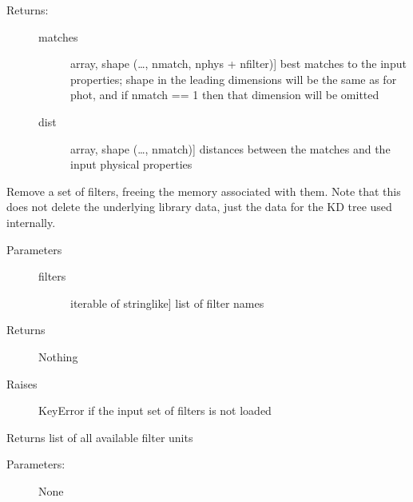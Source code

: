 \documentclass[letterpaper,10pt,english]{sphinxmanual}
\begin{document}
\begin{fulllineitems}
\begin{fulllineitems}
\begin{description}
\begin{description}
\end{description}

\item[{Returns:}] \leavevmode\begin{description}
\item[{matches}] \leavevmode{[}array, shape (…, nmatch, nphys + nfilter){]}
best matches to the input properties; shape in the
leading dimensions will be the same as for phot, and if
nmatch == 1 then that dimension will be omitted

\item[{dist}] \leavevmode{[}array, shape (…, nmatch){]}
distances between the matches and the input physical
properties

\end{description}

\end{description}

\end{fulllineitems}


\begin{fulllineitems}
\label{\detokenize{cluster_slug:slugpy.cluster_slug.cluster_slug.del_filters}}
Remove a set of filters, freeing the memory associated with
them. Note that this does not delete the underlying library
data, just the data for the KD tree used internally.
\begin{description}
\item[{Parameters}] \leavevmode\begin{description}
\item[{filters}] \leavevmode{[}iterable of stringlike{]}
list of filter names

\end{description}

\item[{Returns}] \leavevmode
Nothing

\item[{Raises}] \leavevmode
KeyError if the input set of filters is not loaded

\end{description}

\end{fulllineitems}


\begin{fulllineitems}
\label{\detokenize{cluster_slug:slugpy.cluster_slug.cluster_slug.filter_units}}
Returns list of all available filter units
\begin{description}
\item[{Parameters:}] \leavevmode
None


\end{description}
\end{fulllineitems}
\end{fulllineitems}
\end{document}
